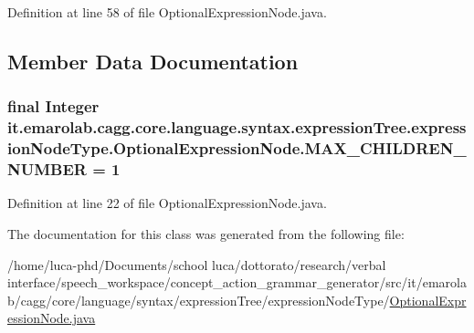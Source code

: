 Definition at line 58 of file Optional\-Expression\-Node.\-java.



\subsection{Member Data Documentation}
\hypertarget{classit_1_1emarolab_1_1cagg_1_1core_1_1language_1_1syntax_1_1expressionTree_1_1expressionNodeType_1_1OptionalExpressionNode_a8f03581e06771b19451b5a5370b619d1}{
\subsubsection[{M\-A\-X\-\_\-\-C\-H\-I\-L\-D\-R\-E\-N\-\_\-\-N\-U\-M\-B\-E\-R}]{\setlength{\rightskip}{0pt plus 5cm}final Integer it.\-emarolab.\-cagg.\-core.\-language.\-syntax.\-expression\-Tree.\-expression\-Node\-Type.\-Optional\-Expression\-Node.\-M\-A\-X\-\_\-\-C\-H\-I\-L\-D\-R\-E\-N\-\_\-\-N\-U\-M\-B\-E\-R = 1\hspace{0.3cm}{\ttfamily [static]}}}\label{classit_1_1emarolab_1_1cagg_1_1core_1_1language_1_1syntax_1_1expressionTree_1_1expressionNodeType_1_1OptionalExpressionNode_a8f03581e06771b19451b5a5370b619d1}


Definition at line 22 of file Optional\-Expression\-Node.\-java.



The documentation for this class was generated from the following file\-:\begin{DoxyCompactItemize}
\item 
/home/luca-\/phd/\-Documents/school luca/dottorato/research/verbal interface/speech\-\_\-workspace/concept\-\_\-action\-\_\-grammar\-\_\-generator/src/it/emarolab/cagg/core/language/syntax/expression\-Tree/expression\-Node\-Type/\hyperlink{OptionalExpressionNode_8java}{Optional\-Expression\-Node.\-java}\end{DoxyCompactItemize}
